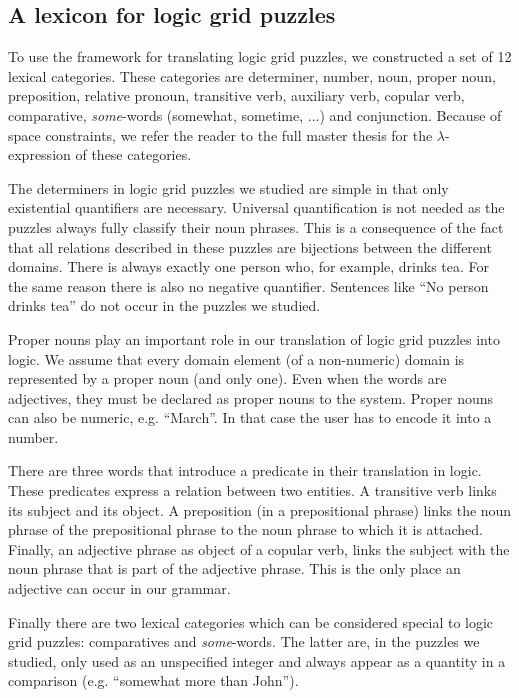 \subsection{A lexicon for logic grid puzzles}
To use the framework for translating logic grid puzzles, we constructed a set of 12 lexical categories. These categories are determiner, number, noun, proper noun, preposition, relative pronoun, transitive verb, auxiliary verb, copular verb, comparative, \textit{some}-words (somewhat, sometime, ...) and conjunction. Because of space constraints, we refer the reader to the full master thesis for the $\lambda$-expression of these categories.

The determiners in logic grid puzzles we studied are simple in that only existential quantifiers are necessary. Universal quantification is not needed as the puzzles always fully classify their noun phrases. This is a consequence of the fact that all relations described in these puzzles are bijections between the different domains. There is always exactly one person who, for example, drinks tea. For the same reason there is also no negative quantifier. Sentences like ``No person drinks tea'' do not occur in the puzzles we studied.

Proper nouns play an important role in our translation of logic grid puzzles into logic. We assume that every domain element (of a non-numeric) domain is represented by a proper noun (and only one). Even when the words are adjectives, they must be declared as proper nouns to the system.
Proper nouns can also be numeric, e.g. ``March''. In that case the user has to encode it into a number.

There are three words that introduce a predicate in their translation in logic. These predicates express a relation between two entities. A transitive verb links its subject and its object. A preposition (in a prepositional phrase) links the noun phrase of the prepositional phrase to the noun phrase to which it is attached. Finally, an adjective phrase as object of a copular verb, links the subject with the noun phrase that is part of the adjective phrase. This is the only place an adjective can occur in our grammar.



Finally there are two lexical categories which can be considered special to logic grid puzzles: comparatives and \textit{some}-words. The latter are, in the puzzles we studied, only used as an unspecified integer and always appear as a quantity in a comparison (e.g. ``somewhat more than John'').
